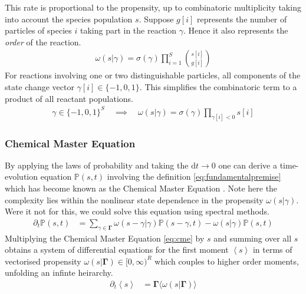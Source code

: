 \documentclass{article}[12pt]
\numberwithin{equation}{section}
\begin{document}
This rate is proportional to the propensity, up to combinatoric multiplicity
taking into account the species population $s$. Suppose $g[i]$ represents the
number of particles of species $i$ taking part in the reaction $\gamma$. Hence
it also represents the \textit{order} of the reaction.
\begin{align}
	\omega(s|\gamma)=
	\sigma(\gamma)
		\prod_{i=1}^S{s[i] \choose g[i]}
	\label{eq:propensity}
\end{align}
For reactions involving one or two distinguishable particles, all
components of the state change vector $\gamma[i]\in\{-1,0,1\}$. This
simplifies the combinatoric term to a product of all reactant populations.
\begin{align}
	\gamma\in\{-1,0,1\}^S\quad\implies\quad
	\omega(s|\gamma)=
	\sigma(\gamma)
	\prod_{\gamma[i]<0} s[i]
	\label{eq:simplifiedpropensity}
\end{align}
\subsubsection{Chemical Master Equation}\vspace{-10pt}
By applying the laws of probability and taking the $\mathrm{d}t\rightarrow 0$
one can derive a time-evolution equation $\mathbb{P}(s,t)$ involving
the definition \eqref{eq:fundamentalpremise} which has become known as the
Chemical Master Equation \cite{Gillespie1992,Gillespie2007}. Note here
the complexity lies within the nonlinear state dependence in the propensity
$\omega(s|\gamma)$. Were it not for this, we could solve this equation using
spectral methods.
\begin{align}
	\partial_t\mathbb{P}(s,t) &=
	\sum_{\gamma\in\mathbf{\Gamma}}
	\omega(s-\gamma|\gamma)\mathbb{P}(s-\gamma,t)-\omega(s|\gamma)\mathbb{P}(s,t)
	\label{eq:cme}
\end{align}
Multiplying the Chemical Master Equation \eqref{eq:cme} by $s$ and summing over all $s$
obtains a system of differential equations for the first moment
$\left\langle s \right\rangle$ in terms of vectorised propensity
$\omega(s|\mathbf{\Gamma})\in[0,\infty)^R$ which couples to higher order moments,
unfolding an infinte heirarchy.
\begin{align}
	\partial_t
	\left\langle s \right\rangle &=
	\mathbf{\Gamma} \big\langle \omega(s|\mathbf{\Gamma}) \big\rangle
	\label{eq:momentheirarchy}
\end{align}
\end{document}
